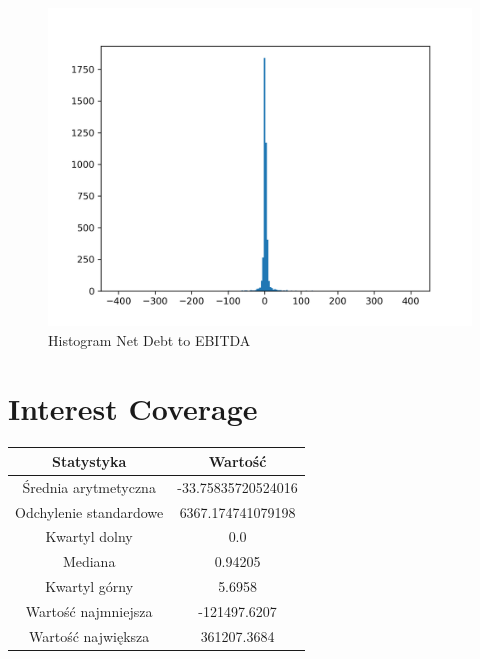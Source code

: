 \documentclass{article}
\begin{document}
\begin{figure}[h!]
    \includegraphics[width=\linewidth]{variables/Net Debt to EBITDA.png}
    \caption{Histogram Net Debt to EBITDA }
\end{figure}\section{ Interest Coverage }

\begin{center}
    \begin{tabular}{|c | c|} 
    \hline
    Statystyka & Wartość \\
    \hline\hline
    Średnia arytmetyczna & -33.75835720524016 \\ 
    \hline
    Odchylenie standardowe & 6367.174741079198 \\
    \hline
    Kwartyl dolny & 0.0 \\
    \hline
    Mediana & 0.94205 \\
    \hline
    Kwartyl górny & 5.6958 \\
    \hline
    Wartość najmniejsza & -121497.6207 \\
    \hline
    Wartość największa & 361207.3684 \\
    \hline
   \end{tabular}
\end{center}
\end{document}

